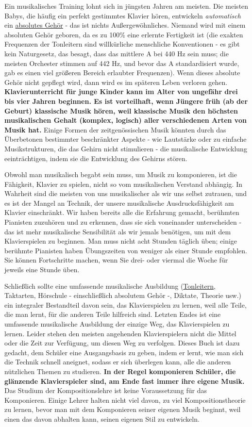 Ein musikalisches Training lohnt sich in jüngsten Jahren am meisten.
Die meisten Babys, die häufig ein perfekt gestimmtes Klavier hören, entwickeln \textit{automatisch} ein \hyperref[c1iii12]{absolutes Gehör} - das ist nichts Außergewöhnliches.
Niemand wird mit einem absoluten Gehör geboren, da es zu 100\% eine erlernte Fertigkeit ist (die exakten Frequenzen der Tonleitern sind willkürliche menschliche Konventionen - es gibt kein Naturgesetz, das besagt, dass das mittlere A bei 440 Hz sein muss; die meisten Orchester stimmen auf 442 Hz, und bevor das A standardisiert wurde, gab es einen viel größeren Bereich erlaubter Frequenzen).
Wenn dieses absolute Gehör nicht gepflegt wird, dann wird es im späteren Leben verloren gehen.
\textbf{Klavierunterricht für junge Kinder kann im Alter von ungefähr drei bis vier Jahren beginnen.
Es ist vorteilhaft, wenn Jüngere früh (ab der Geburt) klassische Musik hören, weil klassische Musik den höchsten musikalischen Gehalt (komplex, logisch) aller verschiedenen Arten von Musik hat.}
Einige Formen der zeitgenössischen Musik könnten durch das Überbetonen bestimmter beschränkter Aspekte - wie Lautstärke oder zu einfache Musikstrukturen, die das Gehirn nicht stimulieren - die musikalische Entwicklung eeinträchtigen, indem sie die Entwicklung des Gehirns stören.

Obwohl man musikalisch begabt sein muss, um Musik zu komponieren, ist die Fähigkeit, Klavier zu spielen, nicht so vom musikalischen Verstand abhängig.
In Wahrheit sind die meisten von uns musikalischer als wir uns selbst zutrauen, und es ist der Mangel an Technik, der unsere musikalische Ausdrucksfähigkeit am Klavier einschränkt.
Wir haben bereits alle die Erfahrung gemacht, berühmten Pianisten zuzuhören und zu erkennen, dass sie sich voneinander unterscheiden - das ist mehr musikalische Sensibilität als wir jemals benötigen, um mit dem Klavierspielen zu beginnen.
Man muss nicht acht Stunden täglich üben; einige berühmte Pianisten haben Übungszeiten von weniger als einer Stunde empfohlen.
Sie können Fortschritte machen, wenn Sie drei- oder viermal die Woche für jeweils eine Stunde üben.

Schließlich sollte eine umfassende musikalische Ausbildung (\hyperref[c1iii5a]{Tonleitern}, Taktarten, Hörschule - einschließlich absolutem Gehör -, Diktate, Theorie usw.) ein integraler Bestandteil davon sein, das Klavierspielen zu lernen, weil alle Teile, die man lernt, für die anderen Teile hilfreich sind.
Letzten Endes ist eine umfassende musikalische Ausbildung der einzige Weg, das Klavierspielen zu lernen.
Leider stehen den meisten angehenden Klavierspielern nicht die Mittel oder die Zeit zur Verfügung, um diesen Weg zu verfolgen.
Dieses Buch ist dazu gedacht, dem Schüler eine Ausgangsbasis zu geben, indem er lernt, wie man sich die Technik schnell aneignet, sodass er sich überlegen kann, alle die anderen nützlichen Themen zu studieren.
\textbf{In der Regel komponieren Schüler, die glänzende Klavierspieler sind, am Ende fast immer ihre eigene Musik.}
Das Studium der Kompositionslehre ist keine Voraussetzung für das Komponieren.
Einige Lehrer halten nicht viel davon, zu viel Kompositionstheorie zu lernen, bevor man mit dem Komponieren seiner eigenen Musik beginnt, weil einen das davon abhalten kann, seinen eigenen Stil zu entwickeln.

